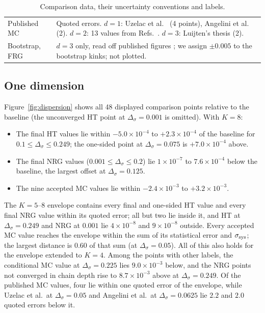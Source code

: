 \documentclass[11pt,a4paper]{article}
\numberwithin{equation}{section}
\newcommand{\Ds}{\Delta_\sigma}
\newcommand{\sci}[2]{#1\times10^{#2}}
\begin{document}
\begin{table}[htbp]
\begin{tabular}{@{}>{\raggedright\arraybackslash}p{}>{\raggedright\arraybackslash}p{}@{}}
Published MC & Quoted errors. $d=1$: Uzelac et al.\ \cite{Uzelac:2001lc} (4 points), Angelini et al.\ \cite{Angelini:2014koy} (2). $d=2$: 13 values from Refs.~\cite{Angelini:2014koy,Luijten:1997th,Picco:2012ak,Xiao:2025sk}. $d=3$: Luijten's thesis \cite{Luijten:1997th} (2).\\
Bootstrap, FRG & $d=3$ only, read off published figures \cite{Behan:2023ile,Defenu:2014bea}; we assign $\pm0.005$ to the bootstrap kinks; not plotted.\\
\bottomrule
\end{tabular}
\caption{Comparison data, their uncertainty conventions and labels.}
\label{tab:refstatus}
\end{table}

\subsection{One dimension}\label{sec:cmp1d}
Figure~\ref{fig:dispersion} shows all 48 displayed comparison points relative to the
baseline (the unconverged HT point at $\Ds=0.001$ is omitted). With $K=8$:
\begin{itemize}
\item The final HT values lie within $\sci{-5.0}{-4}$ to $\sci{+2.3}{-4}$ of the baseline
for $0.1\le\Ds\le0.249$; the one-sided point at $\Ds=0.075$ is $\sci{+7.0}{-4}$ above.
\item The final NRG values ($0.001\le\Ds\le0.2$) lie $\sci{1}{-7}$ to $\sci{7.6}{-4}$ below the
baseline, the largest offset at $\Ds=0.125$.
\item The nine accepted MC values lie within $\sci{-2.4}{-3}$ to $\sci{+3.2}{-3}$.
\end{itemize}
The $K=5$--$8$ envelope contains every final and one-sided HT value and every final NRG value
within its quoted error; all but two lie inside it, and HT at $\Ds=0.249$ and NRG at $0.001$
lie $\sci{4}{-8}$ and $\sci{9}{-8}$ outside. Every accepted MC value reaches the envelope
within the sum of its statistical error and $\sigma_{\rm sys}$; the largest distance is $0.60$
of that sum (at $\Ds=0.05$). All of this also holds for the envelope extended to $K=4$. Among
the points with other labels, the conditional MC value at $\Ds=0.225$ lies $\sci{9.0}{-3}$
below, and the NRG points not converged in chain depth rise to $\sci{8.7}{-3}$ above at
$\Ds=0.249$. Of the published MC values, four lie within one quoted error of the envelope,
while Uzelac et al.\ at $\Ds=0.05$ and Angelini et al.\ at $\Ds=0.0625$ lie $2.2$ and $2.0$
quoted errors below it.
\end{document}
